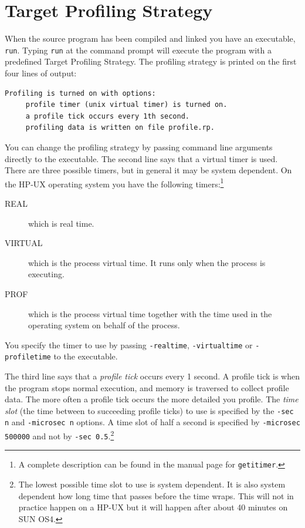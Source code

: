 \documentclass[12pt]{book}
\begin{document}
\section{Target Profiling Strategy}
When the source program has been compiled and linked you have an
executable, \texttt{run}. Typing \texttt{run} at the command prompt will
execute the program with a predefined Target Profiling
Strategy.  The profiling strategy is
printed on the first four lines of output:

\begin{verbatim}
Profiling is turned on with options:
     profile timer (unix virtual timer) is turned on.
     a profile tick occurs every 1th second.
     profiling data is written on file profile.rp.
\end{verbatim}
\noindent
You can change the profiling strategy by passing command line arguments
directly to the executable.  The
second line says that a virtual timer is used. There are three possible
timers, but in general it may be system dependent. On the HP-UX operating
system you have the following timers:\footnote{A complete description can
  be found in the manual page for \texttt{getitimer}.}
\begin{description}
\item[REAL] which is real time.
\item[VIRTUAL] which is the process virtual time. It runs only when the
  process is executing.
\item[PROF] which is the process virtual time together with the time used
  in the operating system on behalf of the process.
\end{description}
\noindent
You specify the timer to use by passing
\texttt{-realtime},
\texttt{-virtualtime} or 
\texttt{-profiletime} to the executable.

The third line says that a \emph{profile tick} occurs every 1 second.
A profile tick is when the program stops normal execution, and memory
is traversed to collect profile data. The more often a profile tick
occurs the more detailed you profile. The \emph{time slot} (the time
between to succeeding profile ticks) to use is specified by the
\texttt{-sec n} and 
\texttt{-microsec n} options. A time slot of half a
second is specified by \texttt{-microsec 500000} and not
by \texttt{-sec 0.5}.\footnote{The lowest possible time slot to use is
  system dependent. It is also system dependent how long time that
  passes before the time wraps. This will not in practice happen on a
  HP-UX but it will happen after about 40 minutes on SUN OS4.}
\end{document}
